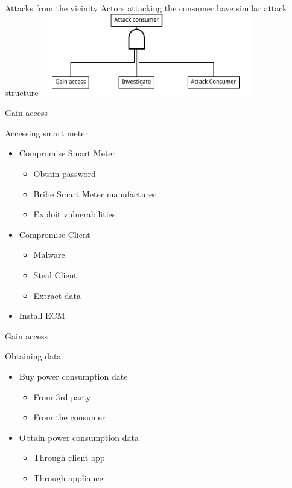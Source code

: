 \begin{frame}{Attacks from the vicinity}
  Actors attacking the consumer have similar attack structure
\center
  \includegraphics[width=0.7\textwidth]{graphics/common_attack.pdf}
\end{frame}

\begin{frame}{Gain access}
  \begin{block}{Accessing smart meter}
    \begin{itemize}
      \item Compromise Smart Meter
      \begin{itemize}
        \item Obtain password
        \item Bribe Smart Meter manufacturer
        \item Exploit vulnerabilities
      \end{itemize}
      \item Compromise Client
      \begin{itemize}
        \item Malware
        \item Steal Client
        \item Extract data
      \end{itemize}
      \item Install ECM
    \end{itemize}
  \end{block}
\end{frame}

\begin{frame}{Gain access}
  \begin{block}{Obtaining data }
    \begin{itemize}
      \item Buy power consumption date
      \begin{itemize}
        \item From 3rd party
        \item From the consumer
      \end{itemize}
      \item Obtain power consumption data
      \begin{itemize}
        \item Through client app
        \item Through appliance
      \end{itemize}
    \end{itemize}
  \end{block}
\end{frame}

